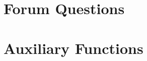 \documentclass[runningheads]{llncs}
\begin{document}
\footnotesize
\printbibliography{}


\appendix

\section{Forum Questions}
\label{app:forum}


\section{Auxiliary Functions}
\label{app:aux-functions}



\clearpage
\begingroup\let\newpage\relax\printglossary[title=Glossary]
\endgroup
\end{document}
